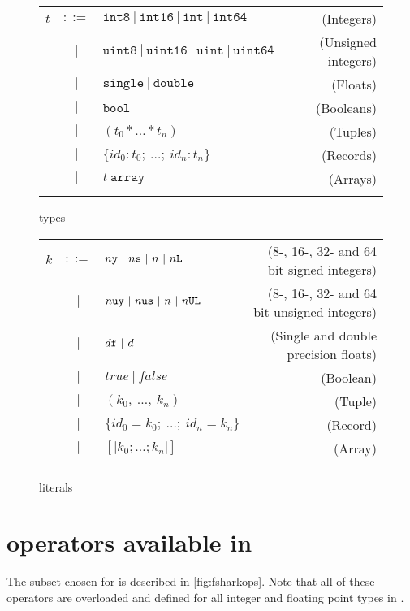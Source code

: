 \begin{figure}[h]
  \centering
  \begin{tabular}{@{}lclr}
    $t$ & $::=$ & $\texttt{int8}~|~\texttt{int16} ~|~ \texttt{int} ~ |~\texttt{int64} $ & (Integers) \\
        & $|$   & $\texttt{uint8} ~ | ~\texttt{uint16} ~|~\texttt{uint} ~|~\texttt{uint64} $ & (Unsigned integers) \\
        & $|$   & $\texttt{single} ~| ~\texttt{double}$ & (Floats) \\
        & $|$   & $\texttt{bool}$ & (Booleans) \\
        & $|$   & $(t_0 * \ldots * t_n)$ & (Tuples) \\
        & $|$   & $\{id_0:t_0;~\ldots;~id_n:t_n\}$ & (Records) \\
        & $|$   & $t~\mathtt{array}$& (Arrays) \\
    \\
  \end{tabular}
  \caption{\fshark{} types}
\label{fig:fsharktypes}
\end{figure}

\begin{figure}[h]
  \centering
  \begin{tabular}{@{}lclr}
    $k$ & $::=$ & $n\lit{y}~|~n\lit{s}~|~n~|~n\lit{L}$ & (8-, 16-, 32- and 64 bit signed integers) \\
        & $|$   & $n\lit{uy}~|~n\lit{us}~|~n~|~n\lit{UL}$ & (8-, 16-, 32- and 64 bit unsigned integers) \\
        & $|$   & $d\text{\ttfamily f}~|~d $ & (Single and double precision floats) \\
        & $|$   & $true~|~false$ & (Boolean) \\
        & $|$   & $(k_0 ,~\ldots ,~k_n)$ & (Tuple) \\
        & $|$   & $\{id_0=k_0;~\ldots;~id_n=k_n\}$ & (Record) \\
        & $|$   & $[\vert k_0 ; \ldots ; k_n\vert]$ & (Array) \\
    \\
  \end{tabular}
  \caption{\fshark{} literals}
\label{fig:fsharkliterals}
\end{figure}
\clearpage

\section{\fsharp{} operators available in \fshark{}}
The \fsharp{} subset chosen for \fshark{} is described in \ref{fig:fsharkops}.
Note that all of these operators are overloaded and defined for all integer
and floating point types in \fsharp{}.

